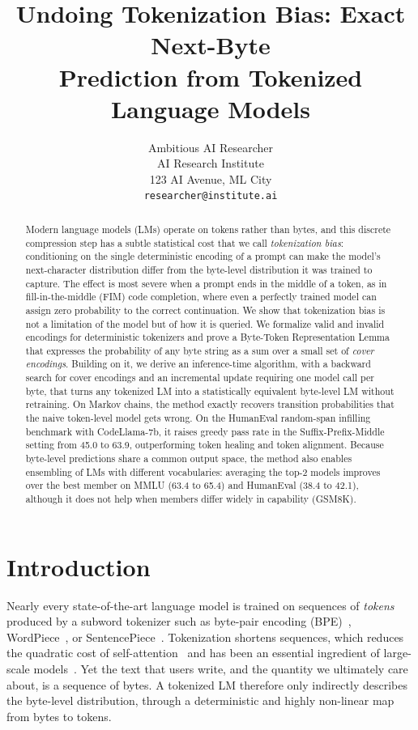 \documentclass{article} %
\title{Undoing Tokenization Bias: Exact Next-Byte \\ Prediction from Tokenized Language Models}
\author{Ambitious AI Researcher\\
AI Research Institute\\
123 AI Avenue, ML City\\
\texttt{researcher@institute.ai}
}
\begin{document}
\maketitle

\begin{abstract}
Modern language models (LMs) operate on tokens rather than bytes, and this discrete compression step has a subtle statistical cost that we call \emph{tokenization bias}: conditioning on the single deterministic encoding of a prompt can make the model's next-character distribution differ from the byte-level distribution it was trained to capture. The effect is most severe when a prompt ends in the middle of a token, as in fill-in-the-middle (FIM) code completion, where even a perfectly trained model can assign zero probability to the correct continuation. We show that tokenization bias is not a limitation of the model but of how it is queried. We formalize valid and invalid encodings for deterministic tokenizers and prove a Byte-Token Representation Lemma that expresses the probability of any byte string as a sum over a small set of \emph{cover encodings}. Building on it, we derive an inference-time algorithm, with a backward search for cover encodings and an incremental update requiring one model call per byte, that turns any tokenized LM into a statistically equivalent byte-level LM without retraining. On Markov chains, the method exactly recovers transition probabilities that the naive token-level model gets wrong. On the HumanEval random-span infilling benchmark with CodeLlama-7b, it raises greedy pass rate in the Suffix-Prefix-Middle setting from 45.0 to 63.9, outperforming token healing and token alignment. Because byte-level predictions share a common output space, the method also enables ensembling of LMs with different vocabularies: averaging the top-2 models improves over the best member on MMLU (63.4 to 65.4) and HumanEval (38.4 to 42.1), although it does not help when members differ widely in capability (GSM8K).
\end{abstract}

\section{Introduction}
\label{sec:intro}
Nearly every state-of-the-art language model is trained on sequences of \emph{tokens} produced by a subword tokenizer such as byte-pair encoding (BPE)~\citep{gage1994bpe,sennrich2016bpe}, WordPiece~\citep{schuster2012wordpiece,wu2016gnmt}, or SentencePiece~\citep{kudo2018sentencepiece}. Tokenization shortens sequences, which reduces the quadratic cost of self-attention~\citep{vaswani2017attention} and has been an essential ingredient of large-scale models~\citep{radford2019gpt2,brown2020gpt3,touvron2023llama2,jiang2023mistral}. Yet the text that users write, and the quantity we ultimately care about, is a sequence of bytes. A tokenized LM therefore only indirectly describes the byte-level distribution, through a deterministic and highly non-linear map from bytes to tokens.
\end{document}
